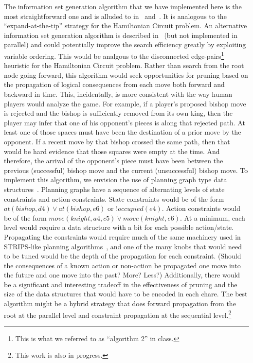 \documentclass[11pt]{article}
\begin{document}
The information set generation algorithm that we have implemented here is the most straightforward one and is alluded to
in~\cite{parker05game} and~\cite{russell05efficient}.  It is analogous to the ``expand-at-the-tip'' strategy for the
Hamiltonian Circuit problem.  An alternative information set generation algorithm is described
in~\cite{richards09information} (but not implemented in parallel) and could potentially improve the search efficiency
greatly by exploiting variable ordering.  This would be analgous to the disconnected edge-pairs\footnote{This is what we
referred to as ``algorithm 2'' in class.} heuristic for the Hamiltonian Circuit problem.  Rather than search from the
root node going forward, this algorithm would seek opportunities for pruning based on the propagation of logical
consequences from each move both forward and backward in time.  This, incidentally, is more consistent with the way
human players would analyze the game.  For example, if a player's proposed bishop move is rejected and the bishop is
sufficiently removed from its own king, then the player may infer that one of his opponent's pieces is along that
rejected path.  At least one of those spaces must have been the destination of a prior move by the opponent.  If a
recent move by that bishop crossed the same path, then that would be hard evidence that those squares were empty at the
time.  And therefore, the arrival of the opponent's piece must have been between the previous (successful) bishop move
and the current (unsuccessful) bishop move.  To implement this algorithm, we envision the use of planning graph type
data structures~\cite{blum97fast}.  Planning graphs have a sequence of alternating levels of state constraints and
action constraints.  State constraints would be of the form $at(bishop,d4) \vee at(bishop,e6)$ or $!occupied(e4)$.
Action constraints would be of the form $move(knight,a4,c5) \vee move(knight,e6)$.  At a minimum, each level would
require a data structure with a bit for each possible action/state.  Propagating the constraints would require much of
the same machinery used in STRIPS-like planning algorithms~\cite{chen05solving}, and one of the many knobs that would
need to be tuned would be the depth of the propagation for each constraint.  (Should the consequences of a known action
or non-action be propagated one move into the future and one move into the past?  More?  Less?)  Additionally, there
would be a significant and interesting tradeoff in the effectiveness of pruning and the size of the data
structures that would have to be encoded in each chare.  The best algorithm might be a hybrid strategy that does forward
propagation from the root at the parallel level and constraint propagation at the sequential level.\footnote{This work
is also in progress.}
\end{document}

